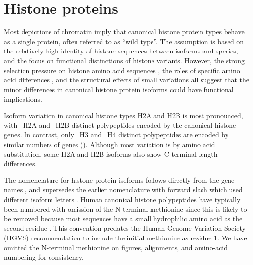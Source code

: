 \section{Histone proteins}
  Most depictions of chromatin imply that
  canonical histone protein types behave as a single protein,
  often referred to as ``wild type''.
  The assumption is based on the relatively high identity of histone sequences
  between isoforms and species,
  and the focus on functional distinctions of histone variants.
  However, the strong selection pressure on histone amino acid
  sequences \citep{NeiRooney2005},
  the roles of specific amino acid differences \citep{MazeAllis2014},
  and the structural effects of small variations \citep{KurumizakaCOSB2013}
  all suggest that the minor differences in canonical histone protein isoforms
  could have functional implications.

  Isoform variation in canonical histone types H2A and H2B is most pronounced,
  with \HTwoAUniqueProteins{}~H2A and \HTwoBUniqueProteins{}~H2B distinct polypeptides
  encoded by the canonical histone genes.
  In contrast, only \HThreeUniqueProteins{}~H3 and \HFourUniqueProteins{}~H4
  distinct polypeptides are encoded by similar numbers of genes ().
  Although most variation is by amino acid substitution,
  some H2A and H2B isoforms also show C-terminal length differences.

  The nomenclature for histone protein isoforms follows directly
  from the gene names \citep{Marzluff02},
  and supersedes the earlier nomenclature with forward slash which used different isoform letters
  \citep{AlbigGenomics1997,AlbigHumangen1997}.
  Human canonical histone polypeptides have typically been numbered
  with omission of the N-terminal methionine
  since this is likely to be removed because most sequences have
  a small hydrophilic amino acid as the second residue \citep{XiaoPeiBiochem2010}.
  This convention predates the Human Genome Variation Society (HGVS) recommendation
  to include the initial methionine as residue 1.
  We have omitted the N-terminal methionine on figures, alignments,
  and amino-acid numbering for consistency.


